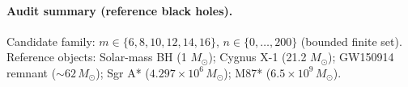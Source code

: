 \paragraph{Audit summary (reference black holes).} \AuditTag Candidate family: $m\in\{6, 8, 10, 12, 14, 16\}$, $n\in\{0,\dots,200\}$ (bounded finite set).
\noindent\AuditTag Reference objects: Solar-mass BH (1 $M_\odot$); Cygnus X-1 (21.2 $M_\odot$); GW150914 remnant ($\sim 62\,M_\odot$); Sgr A* ($4.297\times 10^6\,M_\odot$); M87* ($6.5\times 10^9\,M_\odot$).